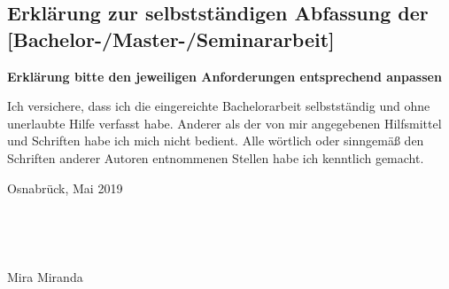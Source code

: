 \documentclass[
	twoside,
	fontsize=12pt,
	headsepline,
	cleardoublepage=empty,
	numbers=noenddot,
	bibliography=totoc,
]{scrbook}
\renewcommand{\thesisAuthor}{Mira Miranda}
\renewcommand{\thesisDate}{Osnabrück, Mai 2019}
\begin{document}

  

\tableofcontents

\cleardoublepage
{}



\listoffigures
\lstlistoflistings
%
%
\printbibliography

\cleardoublepage
\thispagestyle{empty}
\subsection*{Erklärung zur selbstständigen Abfassung der [Bachelor-/Master-/Seminararbeit]}

\textbf{Erklärung bitte den jeweiligen Anforderungen entsprechend anpassen}

Ich versichere, dass ich die eingereichte Bachelorarbeit selbstständig und ohne unerlaubte Hilfe verfasst habe. Anderer als der von mir angegebenen Hilfsmittel und Schriften habe ich mich nicht bedient. Alle wörtlich oder sinngemäß den Schriften anderer Autoren entnommenen Stellen habe ich kenntlich gemacht.


\thesisDate

~

~

\thesisAuthor
\end{document}

